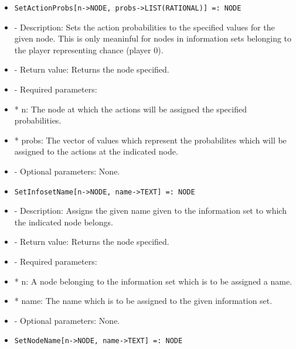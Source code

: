 \begin{itemize}
\ed

\item

\begin{verbatim}
SetActionProbs[n->NODE, probs->LIST(RATIONAL)] =: NODE
\end{verbatim}

\bd
\item
- Description:  Sets the action probabilities to the specified values 
for the given node.  This is only meaninful for nodes in information
sets belonging to the player representing chance (player 0).
\item
- Return value:  Returns the node specified.
\item
- Required parameters:
	
\bd
\item
*  n:  The node at which the actions will be assigned the specified
probabilities.
\item
*  probs:  The vector of values which represent the probabilites 
which will be assigned to the actions at the indicated node.
\ed

\item
- Optional parameters:  None.
\ed

\item

\begin{verbatim}
SetInfosetName[n->NODE, name->TEXT] =: NODE
\end{verbatim}

\bd
\item
- Description:  Assigns the given name given to the information set to 
which the indicated node belongs.
\item
- Return value:  Returns the node specified.
\item
- Required parameters:
	
\bd
\item
*  n:  A node belonging to the information set which is to be 
assigned a name.
\item
*  name:  The name which is to be assigned to the given information set.
\ed

\item
- Optional parameters:  None.
\ed

\item

\begin{verbatim}
SetNodeName[n->NODE, name->TEXT] =: NODE
\end{verbatim}


\end{itemize}
